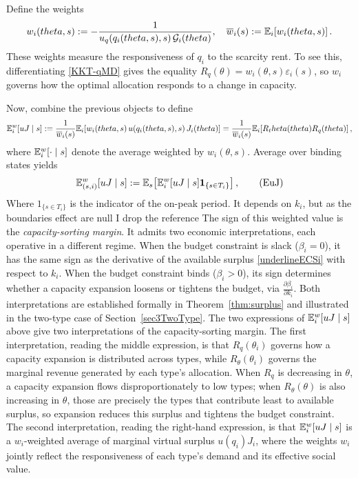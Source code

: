 \documentclass{class}
\begin{document}
Define the weights
\[
w_i(theta,s):=-\frac{1}{u_q\!\left(q_i(theta,s),s\right)\mathcal{G}_i(theta)},
\quad
\overline w_i(s):=\mathbb{E}_{i}\!\left[w_i(theta,s)\right].
\]
These weights measure the responsiveness of $q_i$ to the scarcity rent. To see this, differentiating \ref{KKT-qMD} gives the equality $ R_q(\theta) = w_i(\theta,s)\varepsilon_i(s)  $, so $w_i$ governs how the optimal allocation responds to a change in capacity. 

Now, combine the previous objects to define
\[
\mathbb{E}_i^w[uJ\mid s]
:=
\frac{1}{\overline w_i(s)}
\mathbb{E}_{i}\!\left[w_i(theta,s)\,u\!\left(q_i(theta,s),s\right)J_i(theta)\right]
=
\frac{1}{\overline w_i(s)}
\mathbb{E}_{i}\!\left[R_theta(theta)R_q(theta)\right],
\]
where $\mathbb{E}_i^w[ \cdot \mid s]$ denote the average weighted by $w_i(\theta,s)$. Average over binding states yields
\[
\mathbb{E}_{(s,i)}^w[uJ\mid s] := \mathbb{E}_s\!\left[\mathbb{E}_i^w[uJ\mid s]\mathbf 1_{\{s\in T_i\}}\right], \tag{EuJ}\label{Eujmd}
\]
Where $1_{\{s\in T_i\}}$ is the indicator of the on-peak period. It depends on $k_i$, but as the boundaries effect are null I drop the reference
The sign of this weighted value is the \textit{capacity-sorting margin}. It admits two economic interpretations, each operative in a different regime. When the budget constraint is slack ($\beta_i = 0$), it has the same sign as the derivative of the available surplus \ref{underlineECSi} with respect to $k_i$. When the budget constraint binds ($\beta_i > 0$), its sign determines whether a capacity expansion loosens or tightens the budget, via $\frac{\partial \beta_i}{\partial k_i} $. Both interpretations are established formally in Theorem~\ref{thm:surplus} and illustrated in the two-type case of Section~\ref{sec3TwoType}. The two expressions of $\mathbb{E}_i^w[uJ\mid s]$ above give two interpretations of the capacity-sorting margin. The first interpretation, reading the middle expression, is that $R_q(\theta_i)$ governs how a capacity expansion is distributed across types, while $R_\theta(\theta_i)$ governs the marginal revenue generated by each type's allocation. When $R_q$ is decreasing in $\theta$, a capacity expansion flows disproportionately to low types; when $R_\theta(\theta)$ is also increasing in $\theta$, those are precisely the types that contribute least to available surplus, so expansion reduces this surplus and tightens the budget constraint. The second interpretation, reading the right-hand expression, is that $\mathbb{E}_i^w[uJ\mid s]$ is a $w_i$-weighted average of marginal virtual surplus $u(q_i)J_i$, where the weights $w_i$ jointly reflect the responsiveness of each type's demand and its effective social value.
\end{document}
